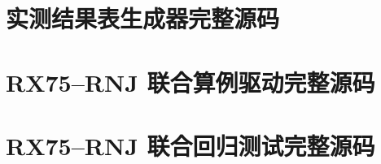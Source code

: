 \documentclass[UTF8,11pt]{ctexart}
\begin{document}


\clearpage
\section{实测结果表生成器完整源码}



\clearpage
\section{RX75--RNJ 联合算例驱动完整源码}



\clearpage
\section{RX75--RNJ 联合回归测试完整源码}


\end{document}
